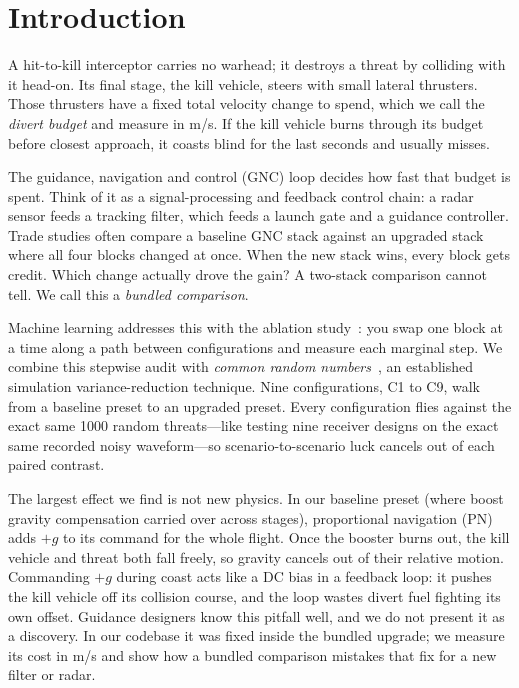 \documentclass[conference,letterpaper]{IEEEtran}
\begin{document}
\section{Introduction}

A hit-to-kill interceptor carries no warhead; it destroys a threat by colliding with it head-on.
Its final stage, the kill vehicle, steers with small lateral thrusters.
Those thrusters have a fixed total velocity change to spend, which we call the \emph{divert budget} and measure in m/s.
If the kill vehicle burns through its budget before closest approach, it coasts blind for the last seconds and usually misses.

The guidance, navigation and control (GNC) loop decides how fast that budget is spent.
Think of it as a signal-processing and feedback control chain: a radar sensor feeds a tracking filter, which feeds a launch gate and a guidance controller.
Trade studies often compare a baseline GNC stack against an upgraded stack where all four blocks changed at once.
When the new stack wins, every block gets credit.
Which change actually drove the gain?
A two-stack comparison cannot tell.
We call this a \emph{bundled comparison}.

Machine learning addresses this with the ablation study~\cite{lipton2019}: you swap one block at a time along a path between configurations and measure each marginal step.
We combine this stepwise audit with \emph{common random numbers}~\cite{glasserman1992}, an established simulation variance-reduction technique.
Nine configurations, C1 to C9, walk from a baseline preset to an upgraded preset.
Every configuration flies against the exact same 1000 random threats—like testing nine receiver designs on the exact same recorded noisy waveform—so scenario-to-scenario luck cancels out of each paired contrast.

The largest effect we find is not new physics.
In our baseline preset (where boost gravity compensation carried over across stages), proportional navigation (PN) adds $+g$ to its command for the whole flight.
Once the booster burns out, the kill vehicle and threat both fall freely, so gravity cancels out of their relative motion.
Commanding $+g$ during coast acts like a DC bias in a feedback loop: it pushes the kill vehicle off its collision course, and the loop wastes divert fuel fighting its own offset.
Guidance designers know this pitfall well, and we do not present it as a discovery.
In our codebase it was fixed inside the bundled upgrade; we measure its cost in m/s and show how a bundled comparison mistakes that fix for a new filter or radar.
\end{document}
